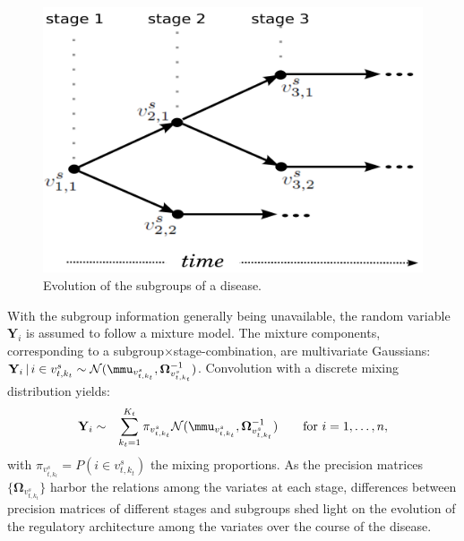 \documentclass[10pt]{article}
\begin{document}
\begin{figure}[h!]
\begin{center}
\includegraphics[angle=0, scale=0.07]{stages2subgroups.png}
\end{center}
\caption{Evolution of the subgroups of a disease.}
\label{fig.diseaseEvolution}
\end{figure}


With the subgroup information generally being unavailable, the random variable $\mathbf{Y}_i$ is assumed to follow a mixture model. The mixture components, corresponding to a
subgroup$\times$stage-combination, are multivariate Gaussians: $\mathbf{Y}_{i} \, | \, i \in v_{t, k_t}^s \sim \mathcal{N}(\mmu_{v_{t, k_t}^s}, \mathbf{\Omega}_{v_{t, k_t}^s}^{-1})$. Convolution with a discrete mixing distribution yields:
\begin{eqnarray} \label{form:mixtureModel}
\mathbf{Y}_{i} & \sim & \sum_{k_t=1}^{K_t} \pi_{v_{t, k_t}^s} \mathcal{N}(\mmu_{v_{t, k_t}^s}, \mathbf{\Omega}_{v_{t, k_t}^s}^{-1}) \qquad \mbox{for } i=1, \ldots, n,
\end{eqnarray}
with $\pi_{v_{t, k_t}^s} = P(i \in v_{t, k_t}^s )$ the mixing proportions. As the precision matrices $\{ \mathbf{\Omega}_{v_{t, k_t}^s} \}$ harbor the relations among the variates at each stage, differences between precision matrices of different stages and subgroups shed light on the evolution of the regulatory architecture among the variates over the course of the disease.


\end{document}
